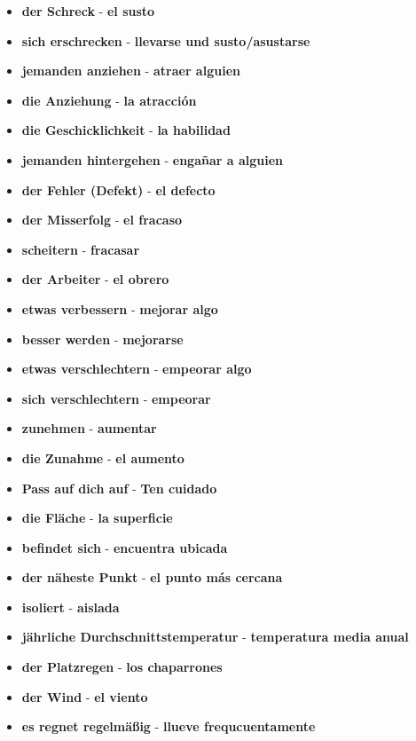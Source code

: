 \documentclass{article}
\begin{document}
\begin{multicols}{2}
\begin{itemize}
		\item{\textbf{der Schreck} - \textbf{el susto}}
		\item{\textbf{sich erschrecken} - \textbf{llevarse und susto/asustarse}}
		\item{\textbf{jemanden anziehen} - \textbf{atraer alguien}}
		\item{\textbf{die Anziehung} - \textbf{la atracción}}
		\item{\textbf{die Geschicklichkeit} - \textbf{la habilidad}}
		\item{\textbf{jemanden hintergehen} - \textbf{engañar a alguien}}
		\item{\textbf{der Fehler (Defekt)} - \textbf{el defecto}}
		\item{\textbf{der Misserfolg} - \textbf{el fracaso}}
		\item{\textbf{scheitern} - \textbf{fracasar}}
		\item{\textbf{der Arbeiter} - \textbf{el obrero}}
		\item{\textbf{etwas verbessern} - \textbf{mejorar algo}}
		\item{\textbf{besser werden} - \textbf{mejorarse}}
		\item{\textbf{etwas verschlechtern} - \textbf{empeorar algo}}
		\item{\textbf{sich verschlechtern} - \textbf{empeorar}}
		\item{\textbf{zunehmen} - \textbf{aumentar}}
		\item{\textbf{die Zunahme} - \textbf{el aumento}}
		\item{\textbf{Pass auf dich auf} - \textbf{Ten cuidado}}
	\end{itemize}
	\newpage
	\begin{itemize}
		\item{\textbf{die Fläche} - \textbf{la superficie}}
		\item{\textbf{befindet sich} - \textbf{encuentra ubicada}}
		\item{\textbf{der näheste Punkt} - \textbf{el punto más cercana}}
		\item{\textbf{isoliert} - \textbf{aislada}}
		\item{\textbf{jährliche Durchschnittstemperatur} - \textbf{temperatura media anual}}
		\item{\textbf{der Platzregen} - \textbf{los chaparrones}}
		\item{\textbf{der Wind} - \textbf{el viento}}
		\item{\textbf{es regnet regelmäßig} - \textbf{llueve frequcuentamente}}

\end{itemize}
\end{multicols}
\end{document}
